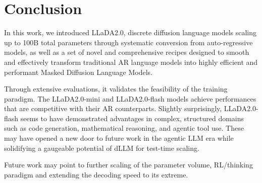 \section{Conclusion}
In this work, we introduced LLaDA2.0, discrete diffusion language models scaling up to 100B total parameters through systematic conversion from auto-regressive models, as well as a set of novel and comprehensive recipes designed to smooth and effectively transform traditional AR language models into highly efficient and performant Masked Diffusion Language Models. 

Through extensive evaluations, it validates the feasibility of the training paradigm. The LLaDA2.0-mini and LLaDA2.0-flash models achieve performances that are competitive with their AR counterparts.
Slightly surprisingly, LLaDA2.0-flash seems to have demonstrated advantages in complex, structured domains such as code generation, mathematical reasoning, and agentic tool use. 
These may have opened a new door to future work in the agentic LLM era while solidifying a gaugeable potential of dLLM for test-time scaling.

Future work may point to further scaling of the parameter volume, RL/thinking paradigm and extending the decoding speed to its extreme.
